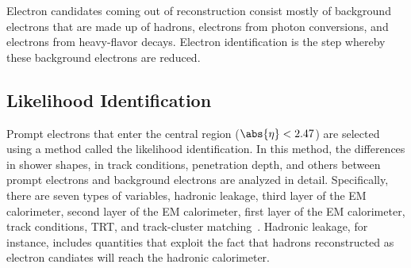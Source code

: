 Electron candidates coming out of reconstruction consist mostly of background
electrons that are made up of hadrons, electrons from photon conversions, and
electrons from heavy-flavor decays. Electron identification is the step whereby
these background electrons are reduced.


\subsection{Likelihood Identification}

Prompt electrons that enter the central region ($\abs{\eta} < 2.47$) are
selected using a method called the likelihood identification. In this method,
the differences in shower shapes, in track conditions, penetration depth, and
others between prompt electrons and background electrons are analyzed in
detail. Specifically, there are seven types of variables, hadronic leakage,
third layer of the EM calorimeter, second layer of the EM calorimeter, first
layer of the EM calorimeter, track conditions, TRT, and track-cluster
matching~\cite{atlaselcid}. Hadronic leakage, for instance, includes quantities
that exploit the fact that hadrons reconstructed as electron candiates will
reach the hadronic calorimeter.



